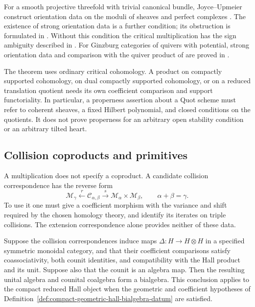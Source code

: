 For a smooth projective threefold with trivial canonical bundle,
Joyce--Upmeier construct orientation data on the moduli of sheaves and
perfect complexes \cite[Theorem~4.4]{JoyceUpmeier}. The existence of
strong orientation data is a further condition; its obstruction is
formulated in \cite[Theorem~3.10]{JoyceUpmeier}. Without this
condition the critical multiplication has the sign ambiguity described
in \cite[Remark~8.7 and Example~8.9]{KinjoParkSafronovCoHA}.
For Ginzburg categories of quivers with potential, strong orientation
data and comparison with the quiver product of
\cite{KSCoHA} are proved
in \cite[Proposition~8.34, Corollary~8.36 and Proposition~8.37]
{KinjoParkSafronovCoHA}.

The theorem uses ordinary critical cohomology. A product on compactly
supported cohomology, on dual compactly supported cohomology, or on a
reduced translation quotient needs its own coefficient comparison and
support functoriality. In particular, a properness assertion about a
Quot scheme must refer to coherent sheaves, a fixed Hilbert polynomial,
and closed conditions on the quotients. It does not prove properness
for an arbitrary open stability condition or an arbitrary tilted heart.

\subsection{Collision coproducts and primitives}
\label{app:hall-coproduct}

A multiplication does not specify a coproduct. A candidate collision
correspondence has the reverse form
\[
 \mathcal M_\gamma\xleftarrow{\ r\ }
 \mathcal C_{\alpha,\beta}\xrightarrow{\ s\ }
 \mathcal M_\alpha\times\mathcal M_\beta,
 \qquad \alpha+\beta=\gamma.
\]
To use it one must give a coefficient morphism with the variance and
shift required by the chosen homology theory, and identify its iterates
on triple collisions. The extension correspondence alone provides
neither of these data.

\begin{theorem}
\label{thm:hall-coproduct}
Suppose the collision correspondences induce maps
$\Delta:H\to H\otimes H$ in a specified symmetric monoidal
category, and that their coefficient comparisons satisfy
coassociativity, both counit identities, and compatibility with the
Hall product and its unit. Suppose also that the counit is an algebra
map. Then the resulting unital algebra and counital coalgebra form
a bialgebra. This conclusion applies to the compact reduced Hall
object when the geometric and coefficient hypotheses of
Definition~\ref{def:compact-geometric-hall-bialgebra-datum} are
satisfied.
\end{theorem}

